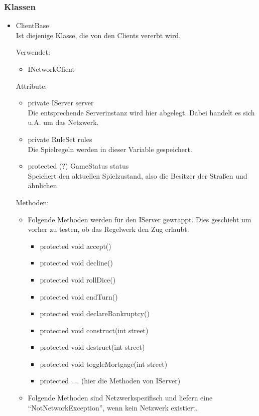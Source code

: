 \documentclass[a4paper,10pt]{article}
\begin{document}
\subsubsection{Klassen}
\begin{itemize}
\item ClientBase\\
Ist diejenige Klasse, die von den Clients vererbt wird.

Verwendet:
\begin{itemize}
\item INetworkClient
\end{itemize}
Attribute:
\begin{itemize}
\item private IServer server \\
Die entsprechende Serverinstanz wird hier abgelegt. Dabei handelt es sich u.A. um das Netzwerk.
\item private RuleSet rules \\
Die Spielregeln werden in dieser Variable gespeichert.
\item protected (?) GameStatus status \\
Speichert den aktuellen Spielzustand, also die Besitzer der Straßen und ähnlichen.
\end{itemize}
Methoden:
\begin{itemize}
\item Folgende Methoden werden für den IServer gewrappt. Dies geschieht um vorher zu testen, ob das Regelwerk den Zug erlaubt.
\begin{itemize}
\item protected void accept()
\item protected void decline()
\item protected void rollDice()
\item protected void endTurn()
\item protected void declareBankruptcy()
\item protected void construct(int street)
\item protected void destruct(int street)
\item protected void toggleMortgage(int street)
\item protected .... (hier die Methoden von IServer) \\
\end{itemize}
\item Folgende Methoden sind Netzwerkspezifisch und liefern eine "`NotNetworkException"', wenn kein Netzwerk existiert.
\begin{itemize}

\end{itemize}
\end{itemize}
\end{itemize}
\end{document}
